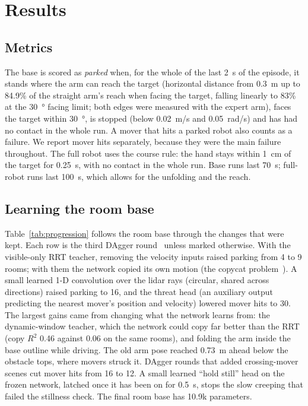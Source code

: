 
\section{Results}
\label{sec:results}

\subsection{Metrics}
The base is scored as \emph{parked} when, for the whole of the last \SI{2}{s} of the episode, it stands where the
arm can reach the target (horizontal distance from \SI{0.3}{m} up to 84.9\% of the straight arm's reach when facing
the target, falling linearly to 83\% at the \SI{30}{\degree} facing limit; both edges were measured with the expert
arm), faces the target within \SI{30}{\degree}, is stopped (below \SI{0.02}{m/s} and \SI{0.05}{rad/s}) and has had no
contact in the whole run. A mover that hits a parked robot also counts as a failure. We report mover hits separately,
because they were the main failure throughout. The full robot uses the course rule: the hand stays within \SI{1}{cm}
of the target for \SI{0.25}{s}, with no contact in the whole run. Base runs last \SI{70}{s}; full-robot runs last
\SI{100}{s}, which allows for the unfolding and the reach.

\subsection{Learning the room base}
Table~\ref{tab:progression} follows the room base through the changes that were kept. Each row is the third DAgger
round~\cite{ross2011dagger} unless marked otherwise. With the visible-only RRT teacher, removing the velocity inputs
raised parking from 4 to 9 rooms; with them the network copied its own motion (the copycat problem~\cite{wen2020copycat}).
A small learned 1-D convolution over the lidar rays (circular, shared across directions) raised parking to 16, and the threat head (an auxiliary output predicting
the nearest mover's position and velocity) lowered mover hits to 30. The largest gains came from changing what the
network learns from: the dynamic-window teacher, which the network could copy far better than the RRT (copy $R^2$ 0.46
against 0.06 on the same rooms), and folding the arm inside the base outline while driving. The old arm pose reached
\SI{0.73}{m} ahead below the obstacle tops, where movers struck it. DAgger rounds that added crossing-mover scenes cut
mover hits from 16 to 12. A small learned ``hold still'' head on the frozen network, latched once it has been on for
\SI{0.5}{s}, stops the slow creeping that failed the stillness check. The final room base has 10.9k parameters.

